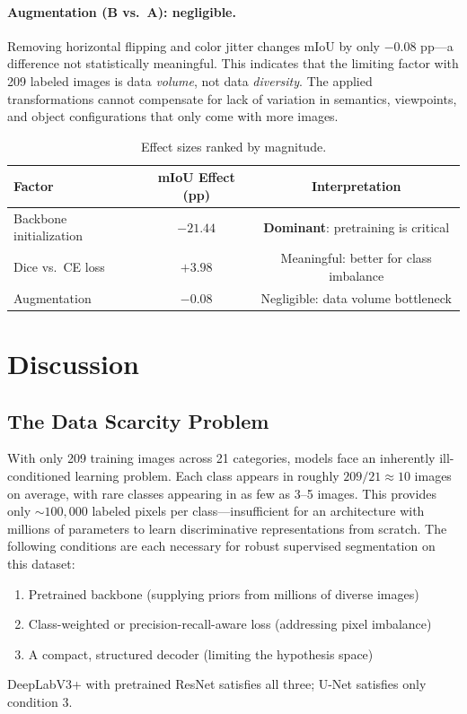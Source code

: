 \documentclass[11pt,a4paper]{article}
\begin{document}
\paragraph{Augmentation (B vs.\ A): negligible.}
Removing horizontal flipping and color jitter changes mIoU by only $-0.08$ pp---a difference not statistically meaningful. This indicates that the limiting factor with 209 labeled images is data \textit{volume}, not data \textit{diversity}. The applied transformations cannot compensate for lack of variation in semantics, viewpoints, and object configurations that only come with more images.

\begin{table}[H]
\centering
\caption{Effect sizes ranked by magnitude.}
\begin{tabular}{lcc}
\toprule
Factor & mIoU Effect (pp) & Interpretation \\
\midrule
Backbone initialization & $-21.44$ & \textbf{Dominant}: pretraining is critical \\
Dice vs.\ CE loss & $+3.98$ & Meaningful: better for class imbalance \\
Augmentation & $-0.08$ & Negligible: data volume bottleneck \\
\bottomrule
\end{tabular}
\end{table}

\section{Discussion}

\subsection{The Data Scarcity Problem}

With only 209 training images across 21 categories, models face an inherently ill-conditioned learning problem. Each class appears in roughly $209 / 21 \approx 10$ images on average, with rare classes appearing in as few as 3--5 images. This provides only $\sim\!100{,}000$ labeled pixels per class---insufficient for an architecture with millions of parameters to learn discriminative representations from scratch. The following conditions are each necessary for robust supervised segmentation on this dataset:
\begin{enumerate}
  \item Pretrained backbone (supplying priors from millions of diverse images)
  \item Class-weighted or precision-recall-aware loss (addressing pixel imbalance)
  \item A compact, structured decoder (limiting the hypothesis space)
\end{enumerate}
DeepLabV3+ with pretrained ResNet satisfies all three; U-Net satisfies only condition 3.
\end{document}

